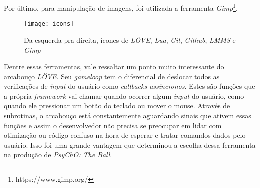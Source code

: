 Por último, para manipulação de imagens, foi utilizada a ferramenta \textit{Gimp}\footnote{https://www.gimp.org/}.

\begin{figure}[h!]
\texttt{[image: icons]}
\centering
\caption{Da esquerda pra direita, ícones de \textit{LÖVE}, \textit{Lua}, \textit{Git}, \textit{Github}, \textit{LMMS} e \textit{Gimp}}
\end{figure}

Dentre essas ferramentas, vale ressaltar um ponto muito interessante do arcabouço \textit{LÖVE}. Seu \textit{gameloop} tem o diferencial de deslocar todos as verificações de \textit{input} do usuário como \textit{callbacks assíncronos}. Estes são funções que a própria \textit{framework} vai chamar quando ocorrer algum \textit{input} do usuário, como quando ele pressionar um botão do teclado ou mover o mouse. Através de subrotinas, o arcabouço está constantemente aguardando sinais que ativem essas funções e assim o desenvolvedor não precisa se preocupar em lidar com otimização ou código confuso na hora de esperar e tratar comandos dados pelo usuário. Isso foi uma grande vantagem que determinou a escolha dessa ferramenta na produção de \textit{PsyChO: The Ball}.

